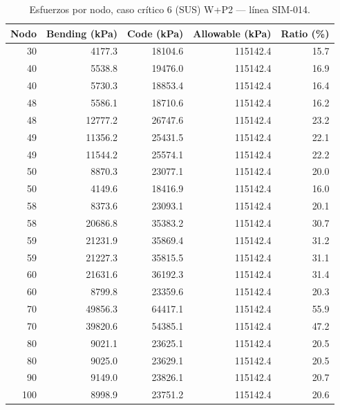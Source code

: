 \begin{table}[htbp]
  \centering
  \footnotesize
  \caption{Esfuerzos por nodo, caso crítico 6 (SUS) W+P2 — línea SIM-014.}
  \label{tab:esfuerzos-critico}
  \begin{tabular}{rrrrr}
    \toprule
    Nodo & Bending (\si{kPa}) & Code (\si{kPa}) & Allowable (\si{kPa}) & Ratio (\%) \\
    \midrule
    30 & \num{4177.3} & \num{18104.6} & \num{115142.4} & 15.7 \\
    40 & \num{5538.8} & \num{19476.0} & \num{115142.4} & 16.9 \\
    40 & \num{5730.3} & \num{18853.4} & \num{115142.4} & 16.4 \\
    48 & \num{5586.1} & \num{18710.6} & \num{115142.4} & 16.2 \\
    48 & \num{12777.2} & \num{26747.6} & \num{115142.4} & 23.2 \\
    49 & \num{11356.2} & \num{25431.5} & \num{115142.4} & 22.1 \\
    49 & \num{11544.2} & \num{25574.1} & \num{115142.4} & 22.2 \\
    50 & \num{8870.3} & \num{23077.1} & \num{115142.4} & 20.0 \\
    50 & \num{4149.6} & \num{18416.9} & \num{115142.4} & 16.0 \\
    58 & \num{8373.6} & \num{23093.1} & \num{115142.4} & 20.1 \\
    58 & \num{20686.8} & \num{35383.2} & \num{115142.4} & 30.7 \\
    59 & \num{21231.9} & \num{35869.4} & \num{115142.4} & 31.2 \\
    59 & \num{21227.3} & \num{35815.5} & \num{115142.4} & 31.1 \\
    60 & \num{21631.6} & \num{36192.3} & \num{115142.4} & 31.4 \\
    60 & \num{8799.8} & \num{23359.6} & \num{115142.4} & 20.3 \\
    70 & \num{49856.3} & \num{64417.1} & \num{115142.4} & 55.9 \\
    70 & \num{39820.6} & \num{54385.1} & \num{115142.4} & 47.2 \\
    80 & \num{9021.1} & \num{23625.1} & \num{115142.4} & 20.5 \\
    80 & \num{9025.0} & \num{23629.1} & \num{115142.4} & 20.5 \\
    90 & \num{9149.0} & \num{23826.1} & \num{115142.4} & 20.7 \\
    100 & \num{8998.9} & \num{23751.2} & \num{115142.4} & 20.6 \\

\end{tabular}
\end{table}
